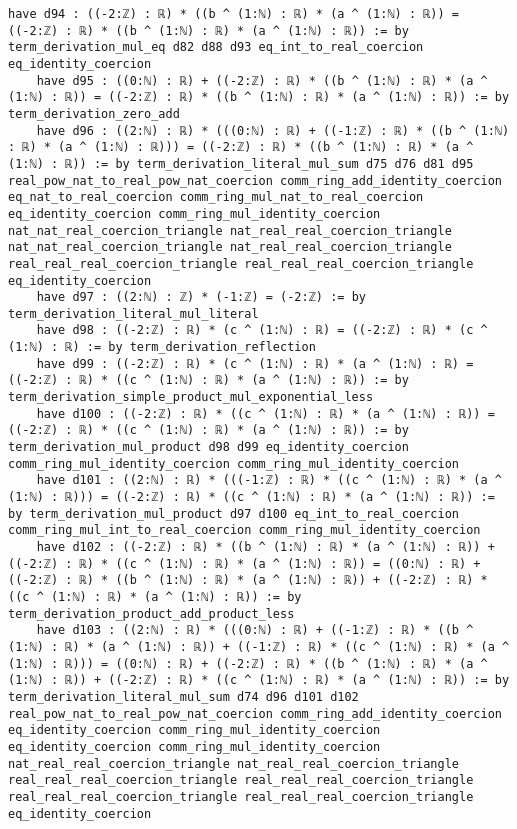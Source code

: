 \documentclass{article}
\begin{document}
\begin{tcolorbox}[colback=white!10, width=\linewidth]
\begin{lstlisting}[language=Lean4]
    have d94 : ((-2:ℤ) : ℝ) * ((b ^ (1:ℕ) : ℝ) * (a ^ (1:ℕ) : ℝ)) = ((-2:ℤ) : ℝ) * ((b ^ (1:ℕ) : ℝ) * (a ^ (1:ℕ) : ℝ)) := by term_derivation_mul_eq d82 d88 d93 eq_int_to_real_coercion eq_identity_coercion
    have d95 : ((0:ℕ) : ℝ) + ((-2:ℤ) : ℝ) * ((b ^ (1:ℕ) : ℝ) * (a ^ (1:ℕ) : ℝ)) = ((-2:ℤ) : ℝ) * ((b ^ (1:ℕ) : ℝ) * (a ^ (1:ℕ) : ℝ)) := by term_derivation_zero_add
    have d96 : ((2:ℕ) : ℝ) * (((0:ℕ) : ℝ) + ((-1:ℤ) : ℝ) * ((b ^ (1:ℕ) : ℝ) * (a ^ (1:ℕ) : ℝ))) = ((-2:ℤ) : ℝ) * ((b ^ (1:ℕ) : ℝ) * (a ^ (1:ℕ) : ℝ)) := by term_derivation_literal_mul_sum d75 d76 d81 d95 real_pow_nat_to_real_pow_nat_coercion comm_ring_add_identity_coercion eq_nat_to_real_coercion comm_ring_mul_nat_to_real_coercion eq_identity_coercion comm_ring_mul_identity_coercion nat_nat_real_coercion_triangle nat_real_real_coercion_triangle nat_nat_real_coercion_triangle nat_real_real_coercion_triangle real_real_real_coercion_triangle real_real_real_coercion_triangle eq_identity_coercion
    have d97 : ((2:ℕ) : ℤ) * (-1:ℤ) = (-2:ℤ) := by term_derivation_literal_mul_literal
    have d98 : ((-2:ℤ) : ℝ) * (c ^ (1:ℕ) : ℝ) = ((-2:ℤ) : ℝ) * (c ^ (1:ℕ) : ℝ) := by term_derivation_reflection
    have d99 : ((-2:ℤ) : ℝ) * (c ^ (1:ℕ) : ℝ) * (a ^ (1:ℕ) : ℝ) = ((-2:ℤ) : ℝ) * ((c ^ (1:ℕ) : ℝ) * (a ^ (1:ℕ) : ℝ)) := by term_derivation_simple_product_mul_exponential_less
    have d100 : ((-2:ℤ) : ℝ) * ((c ^ (1:ℕ) : ℝ) * (a ^ (1:ℕ) : ℝ)) = ((-2:ℤ) : ℝ) * ((c ^ (1:ℕ) : ℝ) * (a ^ (1:ℕ) : ℝ)) := by term_derivation_mul_product d98 d99 eq_identity_coercion comm_ring_mul_identity_coercion comm_ring_mul_identity_coercion
    have d101 : ((2:ℕ) : ℝ) * (((-1:ℤ) : ℝ) * ((c ^ (1:ℕ) : ℝ) * (a ^ (1:ℕ) : ℝ))) = ((-2:ℤ) : ℝ) * ((c ^ (1:ℕ) : ℝ) * (a ^ (1:ℕ) : ℝ)) := by term_derivation_mul_product d97 d100 eq_int_to_real_coercion comm_ring_mul_int_to_real_coercion comm_ring_mul_identity_coercion
    have d102 : ((-2:ℤ) : ℝ) * ((b ^ (1:ℕ) : ℝ) * (a ^ (1:ℕ) : ℝ)) + ((-2:ℤ) : ℝ) * ((c ^ (1:ℕ) : ℝ) * (a ^ (1:ℕ) : ℝ)) = ((0:ℕ) : ℝ) + ((-2:ℤ) : ℝ) * ((b ^ (1:ℕ) : ℝ) * (a ^ (1:ℕ) : ℝ)) + ((-2:ℤ) : ℝ) * ((c ^ (1:ℕ) : ℝ) * (a ^ (1:ℕ) : ℝ)) := by term_derivation_product_add_product_less
    have d103 : ((2:ℕ) : ℝ) * (((0:ℕ) : ℝ) + ((-1:ℤ) : ℝ) * ((b ^ (1:ℕ) : ℝ) * (a ^ (1:ℕ) : ℝ)) + ((-1:ℤ) : ℝ) * ((c ^ (1:ℕ) : ℝ) * (a ^ (1:ℕ) : ℝ))) = ((0:ℕ) : ℝ) + ((-2:ℤ) : ℝ) * ((b ^ (1:ℕ) : ℝ) * (a ^ (1:ℕ) : ℝ)) + ((-2:ℤ) : ℝ) * ((c ^ (1:ℕ) : ℝ) * (a ^ (1:ℕ) : ℝ)) := by term_derivation_literal_mul_sum d74 d96 d101 d102 real_pow_nat_to_real_pow_nat_coercion comm_ring_add_identity_coercion eq_identity_coercion comm_ring_mul_identity_coercion eq_identity_coercion comm_ring_mul_identity_coercion nat_real_real_coercion_triangle nat_real_real_coercion_triangle real_real_real_coercion_triangle real_real_real_coercion_triangle real_real_real_coercion_triangle real_real_real_coercion_triangle eq_identity_coercion

\end{lstlisting}
\end{tcolorbox}
\end{document}

